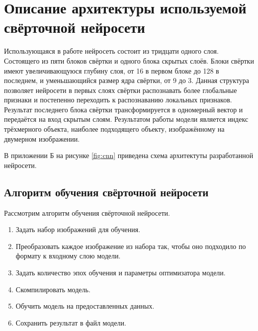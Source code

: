 \section{Описание архитектуры используемой свёрточной нейросети}
Использующаяся в работе нейросеть состоит из тридцати одного слоя. Состоящего из пяти блоков свёртки и одного блока скрытых слоёв. Блоки свёртки имеют увеличивающуюся глубину слоя, от 16 в первом блоке до 128 в последнем, и уменьшающийся размер ядра свёртки, от 9 до 3. Данная структура позволяет нейросети в первых слоях свёртки распознавать более глобальные признаки и постепенно переходить к распознаванию локальных признаков. Результат последнего блока свёртки трансформируется в одномерный вектор и передаётся на вход скрытым слоям. Результатом работы модели является индекс трёхмерного объекта, наиболее подходящего объекту, изображённому на двумерном изображении.

В приложении Б на рисунке \ref{fig:cnn} приведена схема архитектуты разработанной нейросети.

\subsection{Алгоритм обучения свёрточной нейросети}
Рассмотрим алгоритм обучения свёрточной нейросети.
\begin{enumerate}
\item Задать набор изображений для обучения.
\item Преобразовать каждое изображение из набора так, чтобы оно подходило по формату к входному слою модели.
\item Задать количество эпох обучения и параметры оптимизатора модели.
\item Скомпилировать модель.
\item Обучить модель на предоставленных данных.
\item Сохранить результат в файл модели.
\end{enumerate}

